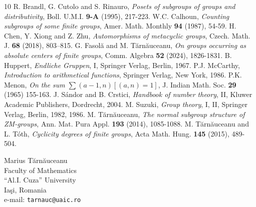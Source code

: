 \documentclass[12pt]{article}
\newcommand{\0}{{\leqno}}
\begin{document}
\begin{thebibliography}{10}
 R. Brandl, G. Cutolo and S. Rinauro, {\it Posets of subgroups of groups and distributivity}, Boll. U.M.I. {\bf 9-A} (1995), 217-223.
 W.C. Calhoun, {\it Counting subgroups of some finite groups}, Amer. Math. Monthly {\bf 94} (1987), 54-59.
 H. Chen, Y. Xiong and Z. Zhu, {\it Automorphisms of metacyclic groups},  Czech. Math. J. {\bf 68} (2018), 803–815.
 G. Fasol\u a and M. T\u arn\u auceanu, {\it On groups occurring as absolute centers of finite groups}, Comm. Algebra {\bf 52} (2024), 1826-1831. 
 B. Huppert, {\it Endliche Gruppen}, I, Springer Verlag, Berlin, 1967.
 P.J. McCarthy, {\it Introduction to arithmetical functions}, Springer Verlag, New York, 1986.
 P.K. Menon, {\it On the sum $\sum(a-1,n)[(a,n)=1]$}, J. Indian Math. Soc. {\bf 29} (1965) 155-163.
 J. S\'{a}ndor and B. Crstici, {\it Handbook of number theory}, II, Kluwer Academic Publishers, Dordrecht, 2004.
 M. Suzuki, {\it Group theory}, I, II, Springer Verlag, Berlin, 1982, 1986.
 M. T\u arn\u auceanu, {\it The normal subgroup structure of ZM-groups}, Ann. Mat. Pura Appl. {\bf 193} (2014), 1085-1088.
 M. T\u arn\u auceanu and L. T\'{o}th, {\it Cyclicity degrees of finite groups}, Acta Math. Hung. {\bf 145} (2015), 489-504.
\end{thebibliography}

\vspace*{5ex}\small

\hfill
\begin{minipage}[t]{5cm}
Marius T\u arn\u auceanu \\
Faculty of  Mathematics \\
``Al.I. Cuza'' University \\
Ia\c si, Romania \\
e-mail: {\tt tarnauc@uaic.ro}
\end{minipage}
\end{document}
